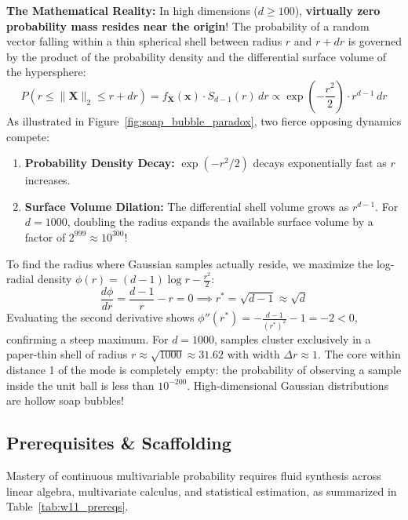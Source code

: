 \textbf{The Mathematical Reality:} In high dimensions ($d \ge 100$), \textbf{virtually zero probability mass resides near the origin}!
The probability of a random vector falling within a thin spherical shell between radius $r$ and $r + dr$ is governed by the product of the probability density and the differential surface volume of the hypersphere:
\begin{equation}
P(r \le \|\mathbf{X}\|_2 \le r + dr) = f_{\mathbf{X}}(\mathbf{x}) \cdot S_{d-1}(r) \, dr \propto \exp\left( -\frac{r^2}{2} \right) \cdot r^{d-1} \, dr
\end{equation}
As illustrated in Figure~\ref{fig:soap_bubble_paradox}, two fierce opposing dynamics compete:
\begin{enumerate}
    \item \textbf{Probability Density Decay:} $\exp(-r^2/2)$ decays exponentially fast as $r$ increases.
    \item \textbf{Surface Volume Dilation:} The differential shell volume grows as $r^{d-1}$. For $d = 1000$, doubling the radius expands the available surface volume by a factor of $2^{999} \approx 10^{300}$!
\end{enumerate}

To find the radius where Gaussian samples actually reside, we maximize the log-radial density $\phi(r) = (d-1)\log r - \frac{r^2}{2}$:
\begin{equation}
\frac{d\phi}{dr} = \frac{d-1}{r} - r = 0 \implies r^* = \sqrt{d - 1} \approx \sqrt{d}
\end{equation}
Evaluating the second derivative shows $\phi''(r^*) = -\frac{d-1}{(r^*)^2} - 1 = -2 < 0$, confirming a steep maximum. For $d = 1000$, samples cluster exclusively in a paper-thin shell of radius $r \approx \sqrt{1000} \approx 31.62$ with width $\Delta r \approx 1$. The core within distance 1 of the mode is completely empty: the probability of observing a sample inside the unit ball is less than $10^{-200}$. High-dimensional Gaussian distributions are hollow soap bubbles!

\subsection{Prerequisites \& Scaffolding}
Mastery of continuous multivariable probability requires fluid synthesis across linear algebra, multivariate calculus, and statistical estimation, as summarized in Table~\ref{tab:w11_prereqs}.

